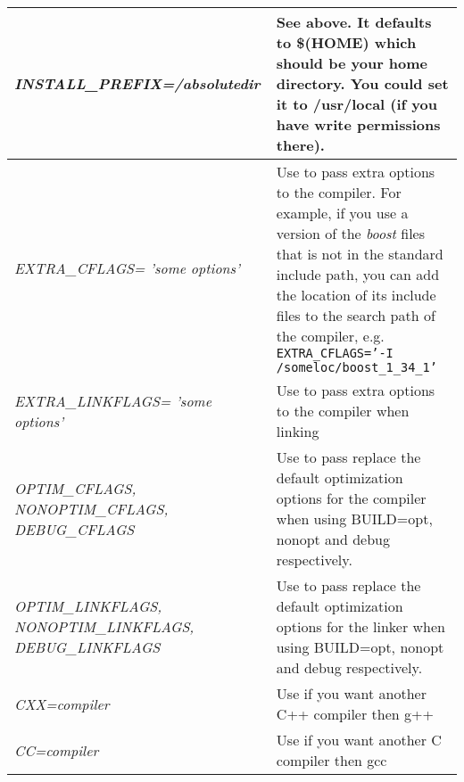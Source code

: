 \documentclass{article}
\begin{document}
\begin{longtable}{|p{\MakeTableFirstCol}|p{\MakeTableSecondCol}|}
{\raggedright
\textit{INSTALL\_PREFIX=/absolutedir}} & 

{\raggedright
See above. It defaults to \$(HOME) which should be your home 
directory. You could set it to /usr/local (if you have write 
permissions there).} \\
\hline

{\raggedright
\textit{EXTRA\_CFLAGS= \linebreak
'some options'}} & 

{\raggedright
Use to pass extra options to the compiler. For example, if you
use a version of the \textit{boost} files that is not in the standard
include path, you can add the location of its include files to the 
search path of the compiler, e.g. \linebreak
\texttt{EXTRA\_CFLAGS='-I /someloc/boost\_1\_34\_1'}} \\
\hline

{\raggedright
\textit{EXTRA\_LINKFLAGS= \linebreak
'some options'}} & 

{\raggedright
Use to pass extra options to the compiler when linking} \\
\hline

{\raggedright
\textit{OPTIM\_CFLAGS, \linebreak
NONOPTIM\_CFLAGS, \linebreak
DEBUG\_CFLAGS}} & 

{\raggedright
Use to pass replace the default optimization options for the compiler when using BUILD=opt, nonopt and debug respectively.} \\
\hline

{\raggedright
\textit{OPTIM\_LINKFLAGS, \linebreak
NONOPTIM\_LINKFLAGS, \linebreak
DEBUG\_LINKFLAGS}} & 

{\raggedright
Use to pass replace the default optimization options for the linker when using BUILD=opt, nonopt and debug respectively.} \\
\hline

{\raggedright
\textit{CXX=compiler}} & 

{\raggedright
Use if you want another C++ compiler then g++} \\
\hline

{\raggedright
\textit{CC=compiler}} & 

{\raggedright
Use if you want another C compiler then gcc} \\
\hline


\end{longtable}
\end{document}
